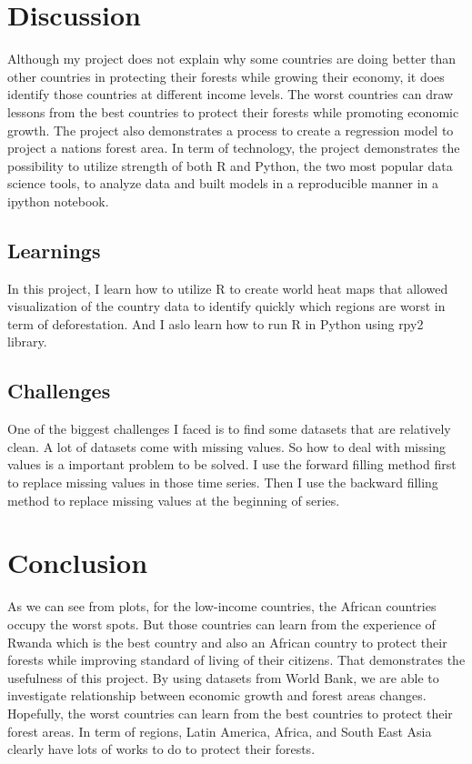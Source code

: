 \documentclass{article}
\begin{document}
\section{Discussion}
Although my project does not explain why some countries are doing better than other countries in protecting their forests while growing their economy, it does identify those countries at different income levels. The worst countries can draw lessons from the best countries to protect their forests while promoting economic growth. The project also demonstrates a process to create a regression model to project a nation\textquotesingle s forest area. In term of technology, the project demonstrates the possibility to utilize strength of both R and Python, the two most popular data science tools, to analyze data and built models in a reproducible manner in a ipython notebook.

\subsection{Learnings}
In this project, I learn how to utilize R to create world heat maps that allowed visualization of the country data to identify quickly which regions are worst in term of deforestation. And I aslo learn how to run R in Python using rpy2 library.

\subsection{Challenges}

One of the biggest challenges I faced is to find some datasets that are relatively clean. A lot of datasets come with missing values. So how to deal with missing values is a important problem to be solved. I use the forward filling method first to replace missing values in those time series. Then I use the backward filling method to replace missing values at the beginning of series. 



\section{Conclusion}

As we can see from plots, for the low-income countries, the African countries occupy the worst spots. But those countries can learn from the experience of Rwanda which is the best country and also an African country to protect their forests while improving standard of living of their citizens. That demonstrates the usefulness of this project. By using datasets from World Bank, we are able to investigate relationship between economic growth and forest areas changes. Hopefully, the worst countries can learn from the best countries to protect their forest areas. In term of regions, Latin America, Africa, and South East Asia clearly have lots of works to do to protect their forests.
\end{document}
